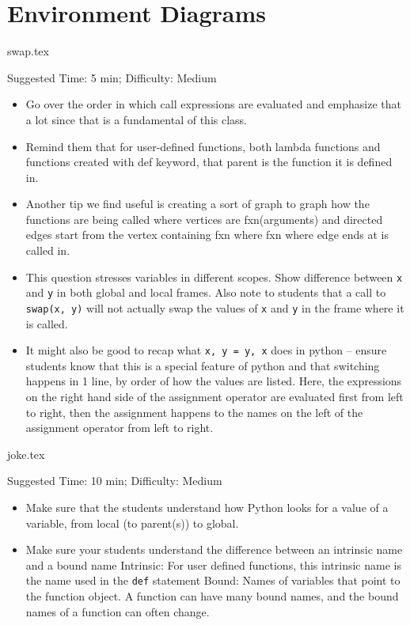 \documentclass{exam}
\begin{document}
\section{Environment Diagrams}
\begin{questions}
    {swap.tex}
    \begin{questionmeta}
        Suggested Time: 5 min; Difficulty: Medium
        \begin{itemize}
            \item Go over the order in which call expressions are evaluated and emphasize that a lot since that is a fundamental of this class.
            \item Remind them that for user-defined functions, both lambda functions and functions created with def keyword, that parent is the function it is defined in.
            \item Another tip we find useful is creating a sort of graph to graph how the functions are being called where vertices are fxn(arguments) and directed edges start from the vertex containing fxn where fxn where edge ends at is called in. 
            \item This question stresses variables in different scopes. 
            \subitem Show difference between \lstinline{x} and \lstinline{y} in both global and local frames.
            \subitem Also note to students that a call to \lstinline{swap(x, y)} will not actually swap the values of \lstinline{x} and \lstinline{y} in the frame where it is called.
            \item It might also be good to recap what \lstinline{x, y = y, x} does in python -- ensure students know that this is a special feature of python and that switching happens in 1 line, by order of how the values are listed. Here, the expressions on the right hand side of the assignment operator are evaluated first from left to right, then the assignment happens to the names on the left of the assignment operator from left to right. 
        \end{itemize}
      \end{questionmeta}
    {joke.tex}
    \begin{questionmeta}
        Suggested Time: 10 min; Difficulty: Medium
        \begin{itemize}
            \item Make sure that the students understand how Python looks for a value of a variable, from local (to parent(s)) to global.
            \item Make sure your students understand the difference between an intrinsic name and a bound name
            \subitem Intrinsic: For user defined functions, this intrinsic name is the name used in the \lstinline{def} statement 
            \subitem Bound: Names of variables that point to the function object. A function can have many bound names, and the bound names of a function can often change. 
        \end{itemize}    
      \end{questionmeta}
          
\end{questions}
\end{document}
